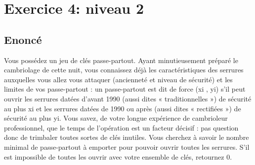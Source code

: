 \documentclass{article}
\begin{document}
    \section{Exercice 4: niveau 2}
        \subsection{Enoncé}
            Vous possédez un jeu de clés passe-partout. Ayant minutieusement préparé le cambriolage de cette nuit,
            vous connaissez déjà les caractéristiques des serrures auxquelles vous allez vous attaquer (ancienneté et niveau
            de sécurité) et les limites de vos passe-partout : un passe-partout est dit de force (xi
            , yi) s’il peut ouvrir les
            serrures datées d’avant 1990 (aussi dites « traditionnelles ») de sécurité au plus xi et les serrures datées de
            1990 ou après (aussi dites « rectifiées ») de sécurité au plus yi.
            Vous savez, de votre longue expérience de cambrioleur professionnel, que le temps de l’opération est un
            facteur décisif : pas question donc de trimbaler toutes sortes de clés inutiles. Vous cherchez à savoir le nombre
            minimal de passe-partout à emporter pour pouvoir ouvrir toutes les serrures. S’il est impossible de toutes les
            ouvrir avec votre ensemble de clés, retournez 0.
        
        \newpage
\end{document}
